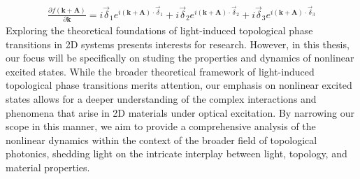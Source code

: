 \begin{align}
	\frac{\partial f(\boldsymbol{k}+\mathbf{A})}{\partial \boldsymbol k}
	=i\vec {\delta}_1 e^{i\left (\boldsymbol k+\mathbf A \right ) \cdot \vec\delta_1}
	+i\vec{\delta}_2 e^{i\left (\boldsymbol k+\mathbf A \right ) \cdot \vec\delta_2}
	+i\vec{\delta}_3 e^{i\left (\boldsymbol k+\mathbf A \right ) \cdot \vec \delta_3}
\end{align}
Exploring the theoretical foundations of light-induced topological phase transitions in 2D systems presents interests for research. However, in this thesis, our focus will be specifically on studing the properties and dynamics of nonlinear excited states. While the broader theoretical framework of light-induced topological phase transitions merits attention, our emphasis on nonlinear excited states allows for a deeper understanding of the complex interactions and phenomena that arise in 2D materials under optical excitation. By narrowing our scope in this manner, we aim to provide a comprehensive analysis of the nonlinear dynamics within the context of the broader field of topological photonics, shedding light on the intricate interplay between light, topology, and material properties.
\color{black}

